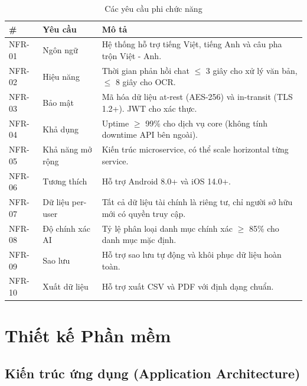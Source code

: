 \begin{table}[htbp]
\centering
\begin{tabularx}{\textwidth}{|l|l|X|}
\hline
\textbf{\#} & \textbf{Yêu cầu} & \textbf{Mô tả} \\ \hline
NFR-01 & Ngôn ngữ & Hệ thống hỗ trợ tiếng Việt, tiếng Anh và câu pha trộn Việt - Anh. \\ \hline
NFR-02 & Hiệu năng & Thời gian phản hồi chat $\le$ 3 giây cho xử lý văn bản, $\le$ 8 giây cho OCR. \\ \hline
NFR-03 & Bảo mật & Mã hóa dữ liệu at-rest (AES-256) và in-transit (TLS 1.2+). JWT cho xác thực. \\ \hline
NFR-04 & Khả dụng & Uptime $\ge$ 99\% cho dịch vụ core (không tính downtime API bên ngoài). \\ \hline
NFR-05 & Khả năng mở rộng & Kiến trúc microservice, có thể scale horizontal từng service. \\ \hline
NFR-06 & Tương thích & Hỗ trợ Android 8.0+ và iOS 14.0+. \\ \hline
NFR-07 & Dữ liệu per-user & Tất cả dữ liệu tài chính là riêng tư, chỉ người sở hữu mới có quyền truy cập. \\ \hline
NFR-08 & Độ chính xác AI & Tỷ lệ phân loại danh mục chính xác $\ge$ 85\% cho danh mục mặc định. \\ \hline
NFR-09 & Sao lưu & Hỗ trợ sao lưu tự động và khôi phục dữ liệu hoàn toàn. \\ \hline
NFR-10 & Xuất dữ liệu & Hỗ trợ xuất CSV và PDF với định dạng chuẩn. \\ \hline
\end{tabularx}
\caption{Các yêu cầu phi chức năng}
\label{tab:nfr}
\end{table}



\section{Thiết kế Phần mềm}
\label{sec:software_design}

\subsection{Kiến trúc ứng dụng (Application Architecture)}
\label{subsec:app_architecture}

